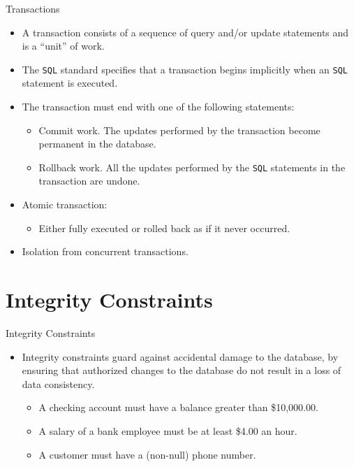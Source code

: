 \documentclass{beamer}
\begin{document}
\begin{frame}{Transactions}
    \begin{itemize}
        \item A transaction consists of a sequence of query and/or update statements and is a ``unit'' of work.
        \item The \texttt{SQL} standard specifies that a transaction begins implicitly when an \texttt{SQL} statement is executed.
        \item The transaction must end with one of the following statements:
        \begin{itemize}
            \item Commit work. The updates performed by the transaction become permanent in the database.
            \item Rollback work. All the updates performed by the \texttt{SQL} statements in the transaction are undone.
        \end{itemize}
        \item Atomic transaction:
        \begin{itemize}
            \item Either fully executed or rolled back as if it never occurred.
        \end{itemize}
        \item Isolation from concurrent transactions.
    \end{itemize}
\end{frame}

\section{Integrity Constraints}

\begin{frame}{Integrity Constraints}
    \begin{itemize}
        \item Integrity constraints guard against accidental damage to the database, by ensuring that authorized changes to the database do not result in a loss of data consistency.
        \begin{itemize}
            \item A checking account must have a balance greater than \$10,000.00.
            \item A salary of a bank employee must be at least \$4.00 an hour.
            \item A customer must have a (non-null) phone number.
        \end{itemize}
    \end{itemize}
\end{frame}
\end{document}
